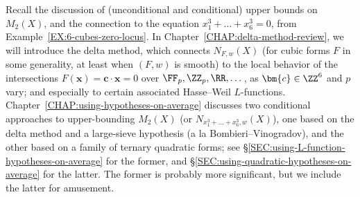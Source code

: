 \documentclass[12pt]{report}
\begin{document}


Recall the discussion of (unconditional and conditional) upper bounds on $M_2(X)$, and the connection to the equation $x_1^3+\dots+x_6^3=0$, from Example~\ref{EX:6-cubes-zero-locus}.
In Chapter~\ref{CHAP:delta-method-review}, we will introduce the delta method, which connects $N_{F,w}(X)$ (for cubic forms $F$ in some generality, at least when $(F,w)$ is smooth)
to the local behavior of the intersections $F(\bm{x}) = \bm{c}\cdot\bm{x} = 0$ over $\FF_p,\ZZ_p,\RR,\dots$, as $\bm{c}\in \ZZ^6$ and $p$ vary;
and especially to certain associated Hasse--Weil $L$-functions.
Chapter~\ref{CHAP:using-hypotheses-on-average} discusses two conditional approaches to upper-bounding $M_2(X)$ (or $N_{x_1^3+\dots+x_6^3,w}(X)$),
one based on the delta method and a large-sieve hypothesis (a la Bombieri--Vinogradov), and the other based on a family of ternary quadratic forms;
see \S\ref{SEC:using-L-function-hypotheses-on-average} for the former, and \S\ref{SEC:using-quadratic-hypotheses-on-average} for the latter.
The former is probably more significant, but we include the latter for amusement.
\end{document}
